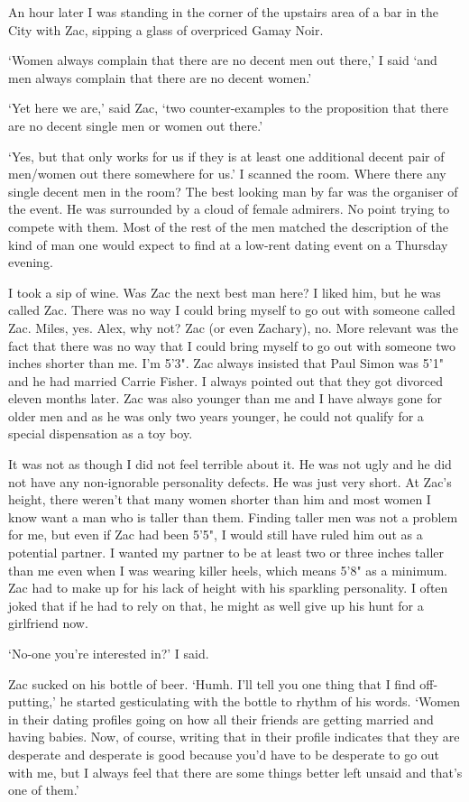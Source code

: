 An hour later I was standing in the corner of the upstairs area of a
bar in the City with Zac, sipping a glass of overpriced Gamay Noir.

`Women always complain that there are no decent men out there,' I
said `and men always complain that there are no decent women.'

`Yet here we are,' said Zac, `two counter-examples to the
proposition that there are no decent single men or women out there.'

`Yes, but that only works for us if they is at least one additional
decent pair of men/women out there somewhere for us.' I scanned the
room. Where there any single decent men in the room? The best
looking man by far was the organiser of the event. He was surrounded
by a cloud of female admirers. No point trying to compete with them.
Most of the rest of the men matched the description of the kind of
man one would expect to find at a low-rent dating event on a Thursday
evening.

I took a sip of wine. Was Zac the next best man here? I liked him,
but he was called Zac. There was no way I could bring myself to go
out with someone called Zac. Miles, yes. Alex, why not? Zac (or even
Zachary), no. More relevant was the fact that there was no way that
I could bring myself to go out with someone two inches shorter than
me. I'm 5'3". Zac always insisted that Paul Simon was 5'1" and he
had married Carrie Fisher. I always pointed out that they got
divorced eleven months later. Zac was also younger than me and I have
always gone for older men and as he was only two years younger, he
could not qualify for a special dispensation as a toy boy.

It was not as though I did not feel terrible about it. He was not
ugly and he did not have any non-ignorable personality
defects. He was just very short. At Zac's height, there weren't that
many women shorter than him and most women I know want a man who is
taller than them. Finding taller men was not a problem for me, but
even if Zac had been 5'5", I would still have ruled him out as a
potential partner. I wanted my partner to be at least two or three
inches taller than me even when I was wearing killer heels, which
means 5'8" as a minimum. Zac had to make up for his lack of height
with his sparkling personality. I often joked that if he had to rely
on that, he might as well give up his hunt for a girlfriend now.

`No-one you're interested in?' I said.

Zac sucked on his bottle of beer. `Humh. I'll tell you one thing
that I find off-putting,' he started gesticulating with the bottle
to rhythm of his words. `Women in their dating profiles going on how
all their friends are getting married and having babies. Now, of
course, writing that in their profile indicates that they are
desperate and desperate is good because you'd have to be desperate
to go out with me, but I always feel that there are some things
better left unsaid and that's one of them.'

